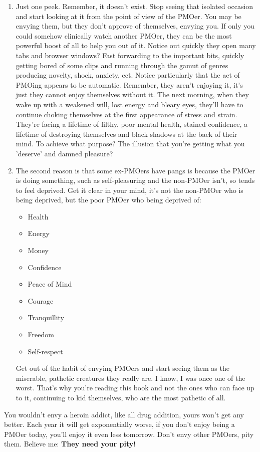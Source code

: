 \documentclass[easypeasy.tex]{subfiles}
\begin{document}
\begin{enumerate}
  \item Just one peek. Remember, it doesn't exist. Stop seeing that isolated occasion and start looking at it from the point of view of the PMOer. You may be envying them, but they don't approve of themselves, envying you. If only you could somehow clinically watch another PMOer, they can be the most powerful boost of all to help you out of it. Notice out quickly they open many tabs and browser windows? Fast forwarding to the important bits, quickly getting bored of some clips and running through the gamut of genres producing novelty, shock, anxiety, ect. Notice particularly that the act of PMOing appears to be automatic. Remember, they aren't enjoying it, it's just they cannot enjoy themselves without it. The next morning, when they wake up with a weakened will, lost energy and bleary eyes, they'll have to continue choking themselves at the first appearance of stress and strain. They're facing a lifetime of filthy, poor mental health, stained confidence, a lifetime of destroying themselves and black shadows at the back of their mind. To achieve what purpose? The illusion that you're getting what you 'deserve' and damned pleasure?

  \item The second reason is that some ex-PMOers have pangs is because the PMOer is doing something, such as self-pleasuring and the non-PMOer isn't, so tends to feel deprived. Get it clear in your mind, it's not the non-PMOer who is being deprived, but the poor PMOer who being deprived of:
  \begin{itemize}
    \item Health
    \item Energy
    \item Money
    \item Confidence
    \item Peace of Mind
    \item Courage
    \item Tranquillity
    \item Freedom
    \item Self-respect
  \end{itemize}

  Get out of the habit of envying PMOers and start seeing them as the miserable, pathetic creatures they really are. I know, I was once one of the worst. That's why you're reading this book and not the ones who can face up to it, continuing to kid themselves, who are the most pathetic of all.
\end{enumerate}

  You wouldn't envy a heroin addict, like all drug addition, yours won't get any better. Each year it will get exponentially worse, if you don't enjoy being a PMOer today, you'll enjoy it even less tomorrow. Don't envy other PMOers, pity them. Believe me: \textbf{They need your pity!}
\end{document}
